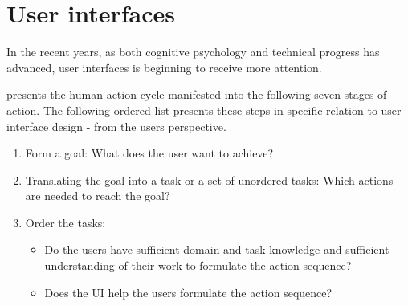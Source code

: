 \section{User interfaces}
In the recent years, as both cognitive psychology and technical progress has advanced, user interfaces is beginning to receive more attention. 

\cite{norman2002design} presents the human action cycle manifested into the following seven stages of action. The following ordered list presents these steps in specific relation to user interface design - from the users perspective.
\begin{enumerate}

  \item Form a goal: What does the user want to achieve?
  \item Translating the goal into a task or a set of unordered tasks: Which actions are needed to reach the goal?
  \item Order the tasks: 
  \begin{itemize}
     \item Do the users have sufficient domain and task knowledge and sufficient understanding of their work to formulate the action sequence?

     \item Does the UI help the users formulate the action sequence?


\end{itemize}
\end{enumerate}
